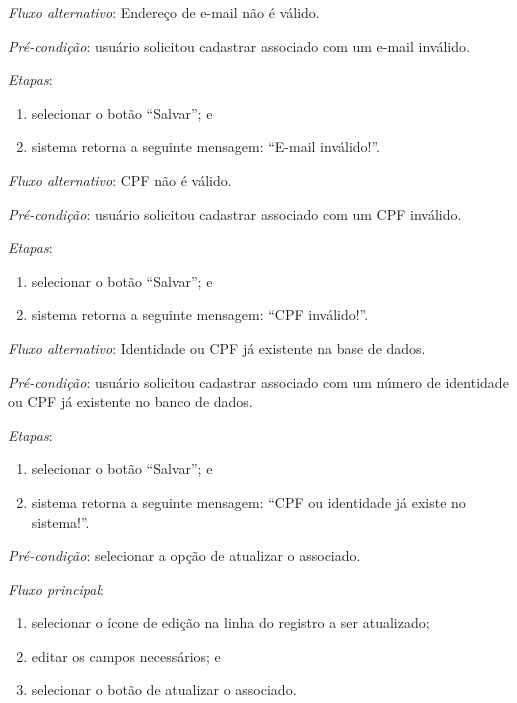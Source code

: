 \noindent \textit{Fluxo alternativo}: Endereço de e-mail não é válido.

\noindent \textit{Pré-condição}: usuário solicitou cadastrar associado com um e-mail inválido.

\noindent \textit{Etapas}:

\begin{enumerate}
    \item selecionar o botão ``Salvar''; e
    \item sistema retorna a seguinte mensagem: ``E-mail inválido!''.
\end{enumerate}


\noindent \textit{Fluxo alternativo}: CPF não é válido.

\noindent \textit{Pré-condição}: usuário solicitou cadastrar associado com um CPF inválido.

\noindent \textit{Etapas}:

\begin{enumerate}
    \item selecionar o botão ``Salvar''; e
    \item sistema retorna a seguinte mensagem: ``CPF inválido!''.
\end{enumerate}


\noindent \textit{Fluxo alternativo}: Identidade ou CPF já existente na base de dados.

\noindent \textit{Pré-condição}: usuário solicitou cadastrar associado com um número de identidade ou CPF já existente no banco de dados.

\noindent \textit{Etapas}:

\begin{enumerate}
    \item selecionar o botão ``Salvar''; e
    \item sistema retorna a seguinte mensagem: ``CPF ou identidade já existe no sistema!''.
\end{enumerate}


\vspace{0.7cm}

\noindent \textit{Pré-condição}: selecionar a opção de atualizar o associado.

\noindent \textit{Fluxo principal}:

\begin{enumerate}
    \item selecionar o ícone de edição na linha do registro a ser atualizado;
    \item editar os campos necessários; e
    \item selecionar o botão de atualizar o associado.
\end{enumerate}

